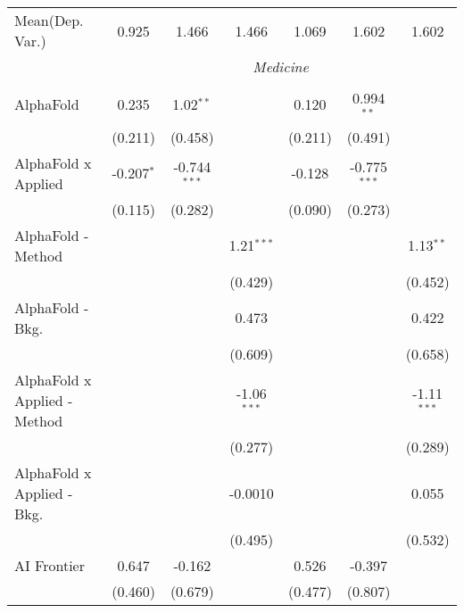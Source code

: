 \begin{tabular}{lcccccc}
Mean(Dep. Var.) & 0.925 & 1.466 & 1.466 & 1.069 & 1.602 & 1.602 \\
 & \multicolumn{6}{c}{\textit{Medicine}} \\ \\
   AlphaFold                      & 0.235          & 1.02$^{**}$    &               & 0.120         & 0.994$^{**}$   &   \\   
                                  & (0.211)        & (0.458)        &               & (0.211)       & (0.491)        &   \\   
   AlphaFold x Applied            & -0.207$^{*}$   & -0.744$^{***}$ &               & -0.128        & -0.775$^{***}$ &   \\   
                                  & (0.115)        & (0.282)        &               & (0.090)       & (0.273)        &   \\   
   AlphaFold - Method             &                &                & 1.21$^{***}$  &               &                & 1.13$^{**}$\\   
                                  &                &                & (0.429)       &               &                & (0.452)\\   
   AlphaFold - Bkg.               &                &                & 0.473         &               &                & 0.422\\   
                                  &                &                & (0.609)       &               &                & (0.658)\\   
   AlphaFold x Applied - Method   &                &                & -1.06$^{***}$ &               &                & -1.11$^{***}$\\   
                                  &                &                & (0.277)       &               &                & (0.289)\\   
   AlphaFold x Applied - Bkg.     &                &                & -0.0010       &               &                & 0.055\\   
                                  &                &                & (0.495)       &               &                & (0.532)\\   
   AI Frontier                    & 0.647          & -0.162         &               & 0.526         & -0.397         &   \\   
                                  & (0.460)        & (0.679)        &               & (0.477)       & (0.807)        &   \\   

\end{tabular}
